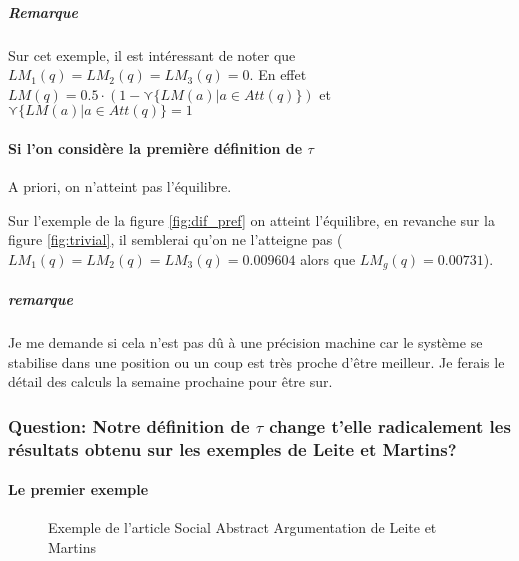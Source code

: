 \documentclass[12pt]{article}
\theoremstyle{defi}
\theoremstyle{not}
\theoremstyle{prob}
\begin{document}
\subparagraph{Remarque\\}
Sur cet exemple, il est intéressant de noter que $LM_1(q) = LM_2(q) = LM_3(q) = 0$. En effet $LM(q) = 0.5 \cdot (1 - \curlyvee \{LM(a) | a\in Att(q)\})$ et $\curlyvee \{LM(a) | a\in Att(q)\} = 1$


\paragraph{Si l'on considère la première définition de $\tau$\\}
A priori, on n'atteint pas l'équilibre.

Sur l'exemple de la figure \ref{fig:dif_pref} on atteint l'équilibre, en revanche sur la figure \ref{fig:trivial}, il semblerai qu'on ne l'atteigne pas ($LM_1(q) = LM_2(q) = LM_3(q) = 0.009604$ alors que $LM_g(q) = 0.00731$).

\subparagraph{remarque\\} Je me demande si cela n'est pas dû à une précision machine car le système se stabilise dans une position ou un coup est très proche d'être meilleur. Je ferais le détail des calculs la semaine prochaine pour être sur.

\subsubsection{Question: Notre définition de $\tau$ change t'elle radicalement les résultats obtenu sur les exemples de Leite et Martins?}

\paragraph{Le premier exemple\\}

\begin{figure}
\centering
{}
\color{blue}
\caption{Exemple de l'article Social Abstract Argumentation de Leite et Martins}
\label{fig:LM_example}
\end{figure}
\end{document}
